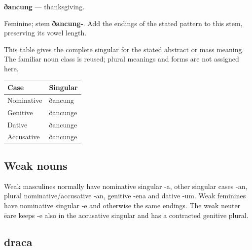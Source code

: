 \par\begin{minipage}{\linewidth}\raggedright
\textbf{ðancung} — thanksgiving.

Feminine; stem \textbf{ðancung-}. Add the endings of the stated pattern to this stem, preserving its vowel length.

This table gives the complete singular for the stated abstract or mass meaning. The familiar noun class is reused; plural meanings and forms are not assigned here.

\par\begingroup
\fontsize{10.5}{13.2}\selectfont
\setlength{\LTleft}{0pt}\setlength{\LTright}{\fill}
\noindent
\begin{tabular}{@{}>{\raggedright\arraybackslash}p{60.59mm}>{\raggedright\arraybackslash}p{60.59mm}@{}}
\toprule
\textbf{Case} & \textbf{Singular} \\
\midrule
Nominative & ðancung \\
Genitive & ðancunge \\
Dative & ðancunge \\
Accusative & ðancunge \\
\bottomrule
\end{tabular}
\par\endgroup

\end{minipage}\par
{}
\subsection*{Weak nouns}

Weak masculines normally have nominative singular -a, other singular cases -an, plural nominative/\allowbreak{}accusative -an, genitive -ena and dative -um. Weak feminines have nominative singular -e and otherwise the same endings. The weak neuter ēare keeps -e also in the accusative singular and has a contracted genitive plural.

\subsection*{draca}

